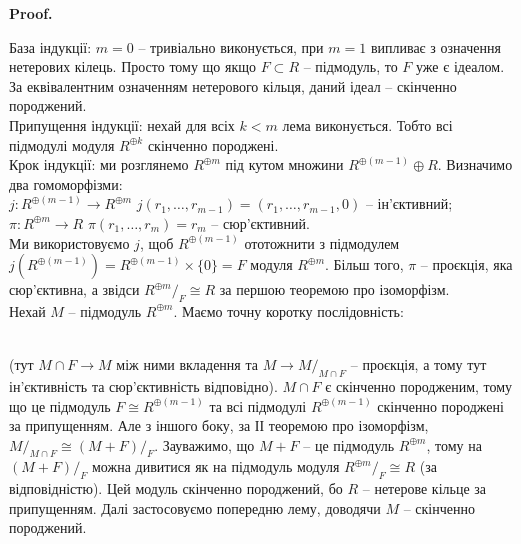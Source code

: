 \documentclass[a4paper, 10pt]{article}
\makeatletter
\theoremstyle{theoremdd}
\theoremstyle{theoremdd}
\theoremstyle{theoremdd}
\theoremstyle{theoremdd}
\theoremstyle{theoremdd}
\theoremstyle{theoremdd}
\theoremstyle{theoremdd}
\theoremstyle{theoremdd}
\theoremstyle{theoremdd}
\theoremstyle{theoremdd}
\theoremstyle{theoremdd}
\theoremstyle{theoremdd}
\theoremstyle{theoremdd}
\theoremstyle{theoremdd}
\theoremstyle{theoremdd}
\renewenvironment{proof}[1][Proof.\\]{\par
\pushQED{\hfill \qed}%
\normalfont \topsep6\p@\@plus6\p@\relax
\trivlist
\item\relax
{\bfseries
#1\@addpunct{.}}\hspace\labelsep\ignorespaces
}{%
\popQED\endtrivlist\@endpefalse
}
\makeatother
\begin{document}
\begin{proof}
База індукції: $m = 0$ -- тривіально виконується, при $m =1$ випливає з означення нетерових кілець. Просто тому що якщо $F \subset R$ -- підмодуль, то $F$ уже є ідеалом. За еквівалентним означенням нетерового кільця, даний ідеал -- скінченно породжений.\\
Припущення індукції: нехай для всіх $k < m$ лема виконується. Тобто всі підмодулі модуля $R^{\oplus k}$ скінченно породжені.\\
Крок індукції: ми розглянемо $R^{\oplus m}$ під кутом множини $R^{\oplus (m-1)} \oplus R$. Визначимо два гомоморфізми:\\
$j \colon R^{\oplus (m-1)} \to R^{\oplus m}$ \qquad $j(r_1,\dots,r_{m-1}) = (r_1,\dots,r_{m-1},0)$ -- ін'єктивний;\\
$\pi \colon R^{\oplus m} \to R$ \qquad\qquad $\pi(r_1,\dots,r_m) = r_m$ -- сюр'єктивний.\\
Ми використовуємо $j$, щоб $R^{\oplus (m-1)}$ ототожнити з підмодулем $j(R^{\oplus (m-1)}) = R^{\oplus (m-1)} \times \{0\} = F$ модуля $R^{\oplus m}$. Більш того, $\pi$ -- проєкція, яка сюр'єктивна, а звідси $R^{\oplus m}/_F \cong R$ за першою теоремою про ізоморфізм.\\
Нехай $M$ -- підмодуль $R^{\oplus m}$. Маємо точну коротку послідовність:\\
\\
(тут $M \cap F \to M$ між ними вкладення та $M \to M/_{M \cap F}$ -- проєкція, а тому тут ін'єктивність та сюр'єктивність відповідно). $M \cap F$ є скінченно породженим, тому що це підмодуль $F \cong R^{\oplus (m-1)}$ та всі підмодулі $R^{\oplus (m-1)}$ скінченно породжені за припущенням. Але з іншого боку, за ІІ теоремою про ізоморфізм, $M/_{M \cap F} \cong (M+F)/_F$. Зауважимо, що $M+F$ -- це підмодуль $R^{\oplus m}$, тому на $(M+F)/_F$ можна дивитися як на підмодуль модуля $R^{\oplus m}/_F \cong R$ (за відповідністю). Цей модуль скінченно породжений, бо $R$ -- нетерове кільце за припущенням. Далі застосовуємо попередню лему, доводячи $M$ -- скінченно породжений.
\end{proof}
\end{document}
